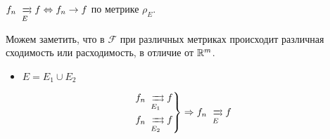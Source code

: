 $f_n \xrightrightarrows[E]{} f \Leftrightarrow f_n \to f$ по метрике $\rho_E$.

Можем заметить, что в $\mathcal F$ при различных метриках происходит различная сходимость или расходимость, в отличие от $\mathbb{R}^m$.

\begin{remark}\itemfix
    \begin{itemize}
        \item $E = E_1 \cup E_2$
    \end{itemize}
    $$\begin{rcases*}
            f_n \xrightrightarrows[E_1]{} f \\
            f_n \xrightrightarrows[E_2]{} f
        \end{rcases*} \Rightarrow f_n \xrightrightarrows[E]{} f$$
\end{remark}


